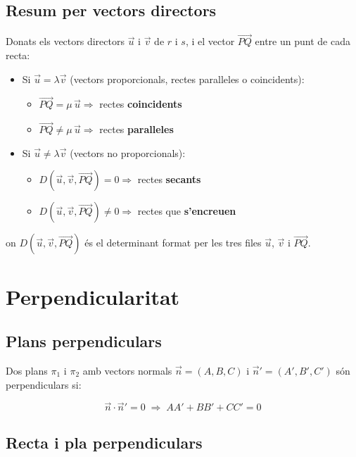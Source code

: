 \subsection{Resum per vectors directors}

Donats els vectors directors $\vec u$ i $\vec v$ de $r$ i $s$, i el vector $\overrightarrow{PQ}$ entre un punt de cada recta:

\begin{itemize}
\item Si $\vec u = \lambda\vec v$ (vectors proporcionals, rectes paral\textperiodcentered{}leles o coincidents):
\begin{itemize}
\item $\overrightarrow{PQ} = \mu\,\vec u \Rightarrow$ rectes \textbf{coincidents}
\item $\overrightarrow{PQ} \neq \mu\,\vec u \Rightarrow$ rectes \textbf{paral\textperiodcentered{}leles}
\end{itemize}
\item Si $\vec u \neq \lambda\vec v$ (vectors no proporcionals):
\begin{itemize}
\item $D(\vec u, \vec v, \overrightarrow{PQ}) = 0 \Rightarrow$ rectes \textbf{secants}
\item $D(\vec u, \vec v, \overrightarrow{PQ}) \neq 0 \Rightarrow$ rectes que \textbf{s'encreuen}
\end{itemize}
\end{itemize}

on $D(\vec u, \vec v, \overrightarrow{PQ})$ és el determinant format per les tres files $\vec u$, $\vec v$ i $\overrightarrow{PQ}$.

\section{Perpendicularitat}

\subsection{Plans perpendiculars}

Dos plans $\pi_1$ i $\pi_2$ amb vectors normals $\vec n = (A, B, C)$ i $\vec n' = (A', B', C')$ són perpendiculars si:

\begin{equation*}
\vec n\cdot\vec n' = 0 \;\Longrightarrow\; AA' + BB' + CC' = 0
\end{equation*}

\subsection{Recta i pla perpendiculars}

